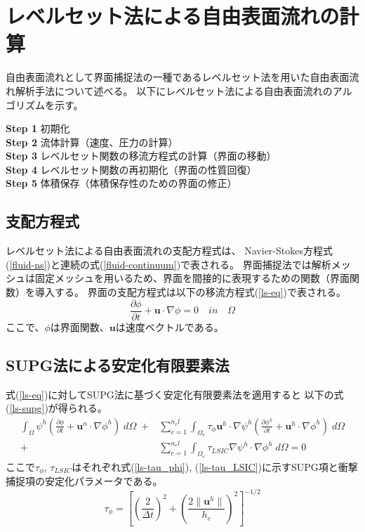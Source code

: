 \newpage
\section{レベルセット法による自由表面流れの計算}
自由表面流れとして界面捕捉法の一種であるレベルセット法を用いた自由表面流れ解析手法について述べる。
以下にレベルセット法による自由表面流れのアルゴリズムを示す。

\indent\textbf{Step 1} 初期化 \\
\indent\textbf{Step 2} 流体計算（速度、圧力の計算） \\
\indent\textbf{Step 3} レベルセット関数の移流方程式の計算（界面の移動） \\
\indent\textbf{Step 4} レベルセット関数の再初期化（界面の性質回復）\\
\indent\textbf{Step 5} 体積保存（体積保存性のための界面の修正）\\

\subsection{支配方程式}
レベルセット法による自由表面流れの支配方程式は、
Navier-Stokes方程式(\ref{fluid-ns})と連続の式(\ref{fluid-continuum})で表される。
界面捕捉法では解析メッシュは固定メッシュを用いるため、界面を間接的に表現するための関数（界面関数）を導入する。
界面の支配方程式は以下の移流方程式(\ref{ls-eq})で表される。
\begin{equation}
\label{ls-eq}
	\frac{\partial \phi}{\partial t} + \bm{u} \cdot \nabla \phi = 0 \quad in \quad \Omega
\end{equation}
ここで、$\phi$は界面関数、$\bm{u}$は速度ベクトルである。

\subsection{SUPG法による安定化有限要素法}
式(\ref{ls-eq})に対してSUPG法に基づく安定化有限要素法を適用すると
以下の式(\ref{ls-supg})が得られる。
\begin{equation}
\label{ls-supg}
		\begin{split}
		\int_{\Omega} \psi^{h}\left( \frac{\partial \phi}{\partial t} + \bm{u}^{n} \cdot \nabla \phi^{h} \right) \; d\Omega \;+& 
		\sum^{n_el}_{e=1} \int_{\Omega_{e}} \tau_{\phi} \bm{u}^{h} \cdot \nabla \psi^{h} \left( \frac{\partial \phi^{h}}{\partial t} + \bm{u}^{h} \cdot \nabla \phi^{h} \right) \; d\Omega \\
		+& \sum^{n_el}_{e=1} \int_{\Omega_{e}} \tau_{LSIC} \nabla \psi^{h} \cdot \nabla \phi^{h} \; d\Omega = 0
	\end{split}
\end{equation}
ここで$\tau_\phi$, $\tau_{LSIC}$はそれぞれ式(\ref{ls-tau_phi}), (\ref{ls-tau_LSIC})に示すSUPG項と衝撃捕捉項の安定化パラメータである。
\begin{equation}
\label{ls-tau_phi}
	\tau_{\phi} = \left[ \left(\frac{2}{\Delta t} \right)^2 + \left(\frac{2 \| \bm{u}^{h} \|}{h_{e}} \right)^2 \right]^{-1/2}
\end{equation}

